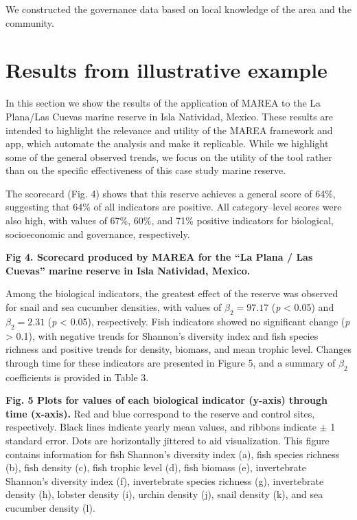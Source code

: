 \documentclass[12pt,]{article}
\begin{document}
We constructed the governance data based on local knowledge of the area
and the community.

\section{Results from illustrative
example}\label{results-from-illustrative-example}

In this section we show the results of the application of MAREA to the
La Plana/Las Cuevas marine reserve in Isla Natividad, Mexico. These
results are intended to highlight the relevance and utility of the MAREA
framework and app, which automate the analysis and make it replicable.
While we highlight some of the general observed trends, we focus on the
utility of the tool rather than on the specific effectiveness of this
case study marine reserve.

The scorecard (Fig. 4) shows that this reserve achieves a general score
of 64\%, suggesting that 64\% of all indicators are positive. All
category--level scores were also high, with values of 67\%, 60\%, and
71\% positive indicators for biological, socioeconomic and governance,
respectively.

\textbf{Fig 4. Scorecard produced by MAREA for the ``La Plana / Las
Cuevas'' marine reserve in Isla Natividad, Mexico.}

Among the biological indicators, the greatest effect of the reserve was
observed for snail and sea cucumber densities, with values of
\(\beta_2 = 97.17\) (\emph{p} \textless{} 0.05) and \(\beta_2 = 2.31\)
(\emph{p} \textless{} 0.05), respectively. Fish indicators showed no
significant change (\emph{p} \textgreater{} 0.1), with negative trends
for Shannon's diversity index and fish species richness and positive
trends for density, biomass, and mean trophic level. Changes through
time for these indicators are presented in Figure 5, and a summary of
\(\beta_2\) coefficients is provided in Table 3.

\textbf{Fig. 5 Plots for values of each biological indicator (y-axis)
through time (x-axis).} Red and blue correspond to the reserve and
control sites, respectively. Black lines indicate yearly mean values,
and ribbons indicate \(\pm\) 1 standard error. Dots are horizontally
jittered to aid visualization. This figure contains information for fish
Shannon's diversity index (a), fish species richness (b), fish density
(c), fish trophic level (d), fish biomass (e), invertebrate Shannon's
diversity index (f), invertebrate species richness (g), invertebrate
density (h), lobster density (i), urchin density (j), snail density (k),
and sea cucumber density (l).
\end{document}
